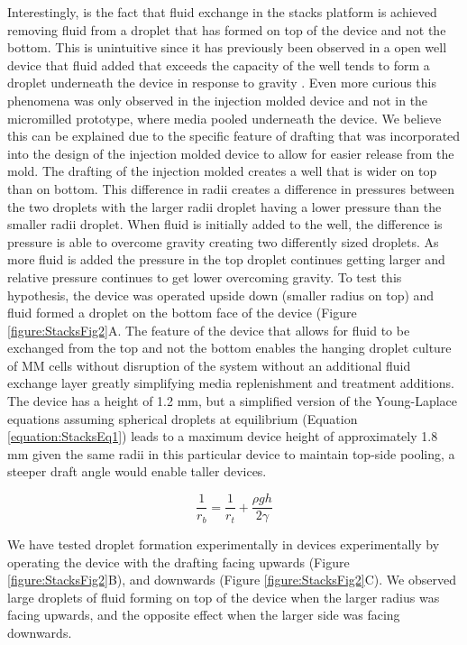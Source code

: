 Interestingly, is the fact that fluid exchange in the stacks platform is achieved removing fluid from a droplet that has formed on top of the device and not the bottom. This is unintuitive since it has previously been observed in a open well device that fluid added that exceeds the capacity of the well tends to form a droplet underneath the device in response to gravity \cite{DeGroot2016}. Even more curious this phenomena was only observed in the injection molded device and not in the micromilled prototype, where media pooled underneath the device. We believe this can be explained due to the specific feature of drafting that was incorporated into the design of the injection molded device to allow for easier release from the mold. The drafting of the injection molded creates a well that is wider on top than on bottom. This difference in radii creates a difference in pressures between the two droplets with the larger radii droplet having a lower pressure than the smaller radii droplet. 
When fluid is initially added to the well, the difference is pressure is able to overcome gravity creating two differently sized droplets. As more fluid is added the pressure in the top droplet continues getting larger and relative pressure continues to get lower overcoming gravity. To test this hypothesis, the device was operated upside down (smaller radius on top) and fluid formed a droplet on the bottom face of the device (Figure \ref{figure:StacksFig2}A. The feature of the device that allows for fluid to be exchanged from the top and not the bottom enables the hanging droplet culture of MM cells without disruption of the system without an additional fluid exchange layer greatly simplifying media replenishment and treatment additions. The device has a height of 1.2 mm, but a simplified version of the Young-Laplace equations assuming spherical droplets at equilibrium (Equation \ref{equation:StacksEq1}) leads to a maximum device height of approximately 1.8 mm given the same radii in this particular device to maintain top-side pooling, a steeper draft angle would enable taller devices. 


\begin{equation}
    \frac{1}{r_{b}} = \frac{1}{r_{t}}+ \frac{\rho gh}{2\gamma}
    \label{equation:StacksEq1}
\end{equation}

We have tested droplet formation experimentally in devices experimentally by operating the device with the drafting facing upwards (Figure \ref{figure:StacksFig2}B), and downwards (Figure \ref{figure:StacksFig2}C). We observed large droplets of fluid forming on top of the device when the larger radius was facing upwards, and the opposite effect when the larger side was facing downwards.

